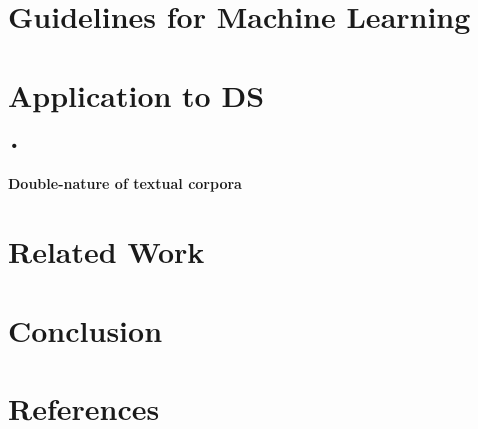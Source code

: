 \documentclass{article}
\begin{document}
\section{Guidelines for Machine Learning}%

\section{Application to DS}%
\paragraph{•}
\paragraph{Double-nature of textual corpora}
\section{Related Work}%
\section{Conclusion}

\section{References}%
\end{document}
